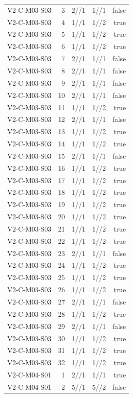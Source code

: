 {\begin{longtable}{lrrrr}
V2-C-M03-S03 & 3 & 2//1 & 1//1 & false \\
V2-C-M03-S03 & 4 & 1//1 & 1//2 & true \\
V2-C-M03-S03 & 5 & 1//1 & 1//2 & true \\
V2-C-M03-S03 & 6 & 1//1 & 1//2 & true \\
V2-C-M03-S03 & 7 & 2//1 & 1//1 & false \\
V2-C-M03-S03 & 8 & 2//1 & 1//1 & false \\
V2-C-M03-S03 & 9 & 2//1 & 1//1 & false \\
V2-C-M03-S03 & 10 & 2//1 & 1//1 & false \\
V2-C-M03-S03 & 11 & 1//1 & 1//2 & true \\
V2-C-M03-S03 & 12 & 2//1 & 1//1 & false \\
V2-C-M03-S03 & 13 & 1//1 & 1//2 & true \\
V2-C-M03-S03 & 14 & 1//1 & 1//2 & true \\
V2-C-M03-S03 & 15 & 2//1 & 1//1 & false \\
V2-C-M03-S03 & 16 & 1//1 & 1//2 & true \\
V2-C-M03-S03 & 17 & 1//1 & 1//2 & true \\
V2-C-M03-S03 & 18 & 1//1 & 1//2 & true \\
V2-C-M03-S03 & 19 & 1//1 & 1//2 & true \\
V2-C-M03-S03 & 20 & 1//1 & 1//2 & true \\
V2-C-M03-S03 & 21 & 1//1 & 1//2 & true \\
V2-C-M03-S03 & 22 & 1//1 & 1//2 & true \\
V2-C-M03-S03 & 23 & 2//1 & 1//1 & false \\
V2-C-M03-S03 & 24 & 1//1 & 1//2 & true \\
V2-C-M03-S03 & 25 & 1//1 & 1//2 & true \\
V2-C-M03-S03 & 26 & 1//1 & 1//2 & true \\
V2-C-M03-S03 & 27 & 2//1 & 1//1 & false \\
V2-C-M03-S03 & 28 & 1//1 & 1//2 & true \\
V2-C-M03-S03 & 29 & 2//1 & 1//1 & false \\
V2-C-M03-S03 & 30 & 1//1 & 1//2 & true \\
V2-C-M03-S03 & 31 & 1//1 & 1//2 & true \\
V2-C-M03-S03 & 32 & 1//1 & 1//2 & true \\
V2-C-M04-S01 & 1 & 2//1 & 1//1 & true \\
V2-C-M04-S01 & 2 & 5//1 & 5//2 & false \\

\end{longtable}}
